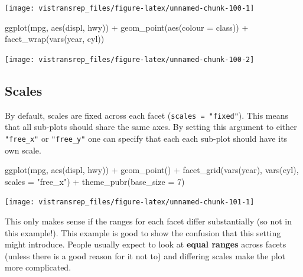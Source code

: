 \documentclass[]{book}
\newenvironment{Shaded}{}{}
\newcommand{\DataTypeTok}[1]{#1}
\newcommand{\DecValTok}[1]{#1}
\newcommand{\KeywordTok}[1]{\textcolor[rgb]{0.00,0.00,1.00}{#1}}
\newcommand{\NormalTok}[1]{#1}
\newcommand{\OperatorTok}[1]{#1}
\newcommand{\StringTok}[1]{\textcolor[rgb]{0.00,0.50,0.50}{#1}}
\begin{document}
\begin{flushright}\texttt{[image: vistransrep\_files/figure-latex/unnamed-chunk-100-1]} \end{flushright}

\begin{Shaded}
\begin{Highlighting}[]
\KeywordTok{ggplot}\NormalTok{(mpg, }\KeywordTok{aes}\NormalTok{(displ, hwy)) }\OperatorTok{+}
\StringTok{  }\KeywordTok{geom_point}\NormalTok{(}\KeywordTok{aes}\NormalTok{(}\DataTypeTok{colour =}\NormalTok{ class)) }\OperatorTok{+}
\StringTok{  }\KeywordTok{facet_wrap}\NormalTok{(}\KeywordTok{vars}\NormalTok{(year, cyl))}
\end{Highlighting}
\end{Shaded}

\begin{flushright}\texttt{[image: vistransrep\_files/figure-latex/unnamed-chunk-100-2]} \end{flushright}

\hypertarget{scales-1}{%
\subsection{Scales}\label{scales-1}}

By default, scales are fixed across each facet (\texttt{scales\ =\ "fixed"}).
This means that all sub-plots should share the same axes.
By setting this argument to either \texttt{"free\_x"} or \texttt{"free\_y"} one can specify that each each sub-plot should have its own scale.

\begin{Shaded}
\begin{Highlighting}[]
\KeywordTok{ggplot}\NormalTok{(mpg, }\KeywordTok{aes}\NormalTok{(displ, hwy)) }\OperatorTok{+}
\StringTok{  }\KeywordTok{geom_point}\NormalTok{() }\OperatorTok{+}
\StringTok{  }\KeywordTok{facet_grid}\NormalTok{(}\KeywordTok{vars}\NormalTok{(year), }\KeywordTok{vars}\NormalTok{(cyl), }\DataTypeTok{scales =} \StringTok{"free_x"}\NormalTok{) }\OperatorTok{+}
\StringTok{  }\KeywordTok{theme_pubr}\NormalTok{(}\DataTypeTok{base_size =} \DecValTok{7}\NormalTok{)}
\end{Highlighting}
\end{Shaded}

\begin{flushright}\texttt{[image: vistransrep\_files/figure-latex/unnamed-chunk-101-1]} \end{flushright}

This only makes sense if the ranges for each facet differ substantially (so not in this example!).
This example is good to show the confusion that this setting might introduce.
People usually expect to look at \textbf{equal ranges} across facets (unless there is a good reason for it not to) and differing scales make the plot more complicated.
\end{document}
